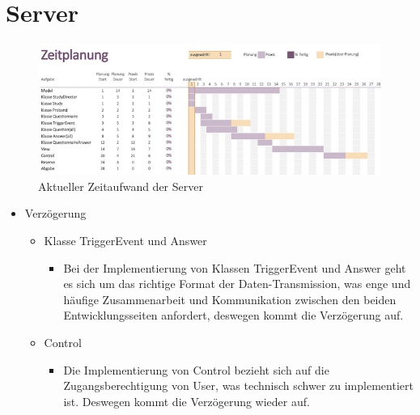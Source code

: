 \documentclass[a4paper]{scrreprt}
\begin{document}
\begin{itemize}
        \end{itemize}


        \section{Server}
        \begin{figure}[H]
        	\centering
        	\includegraphics[scale = 0.65]{ServerZeitPlanung.jpg}
        	\caption{Aktueller Zeitaufwand der Server }
        \end{figure}
        \begin{itemize}
        	\item Verzögerung
        	\begin{itemize}
        		\item Klasse TriggerEvent und Answer
        		\begin{itemize}
        			\item Bei der Implementierung von Klassen TriggerEvent und Answer geht es sich um das richtige Format der Daten-Transmission, was enge und häufige Zusammenarbeit und Kommunikation zwischen den beiden Entwicklungsseiten anfordert, deswegen kommt die Verzögerung auf.
        		\end{itemize}
        	\end{itemize}
        	\begin{itemize}
        		\item Control
        		\begin{itemize}
        			\item Die Implementierung von Control bezieht sich auf die Zugangsberechtigung von User, was technisch schwer zu implementiert ist. Deswegen kommt die Verzögerung wieder auf.
        		\end{itemize}
        	\end{itemize}
        	
        \end{itemize}

       \newpage
\end{document}
